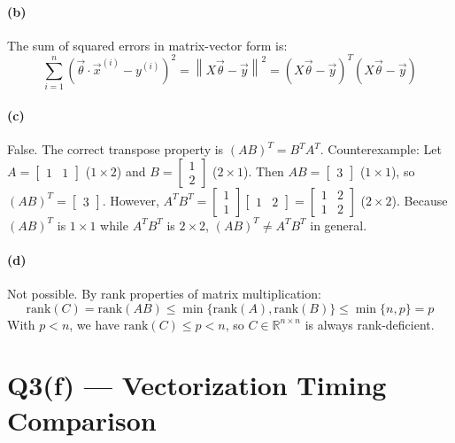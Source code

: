 \documentclass[11pt]{article}
\newcommand{\R}{\mathbb{R}}
\begin{document}
\paragraph{(b)} The sum of squared errors in matrix-vector form is:
\[ \sum_{i=1}^n\left(\vec{\theta}\cdot\vec{x}^{(i)}-y^{(i)}\right)^2 = \left\|X\vec{\theta}-\vec{y}\right\|^2 = \left(X\vec{\theta}-\vec{y}\right)^T\left(X\vec{\theta}-\vec{y}\right) \]

\paragraph{(c)} False. The correct transpose property is $(AB)^T=B^TA^T$.
Counterexample: Let $A=\begin{bmatrix}1&1\end{bmatrix}$ ($1\times2$) and $B=\begin{bmatrix}1\\2\end{bmatrix}$ ($2\times1$).
Then $AB=\begin{bmatrix}3\end{bmatrix}$ ($1\times1$), so $(AB)^T=\begin{bmatrix}3\end{bmatrix}$.
However, $A^TB^T = \begin{bmatrix}1\\1\end{bmatrix}\begin{bmatrix}1&2\end{bmatrix} = \begin{bmatrix}1&2\\1&2\end{bmatrix}$ ($2\times2$).
Because $(AB)^T$ is $1\times1$ while $A^TB^T$ is $2\times2$, $(AB)^T \neq A^TB^T$ in general.

\paragraph{(d)} Not possible. By rank properties of matrix multiplication:
\[ \mathrm{rank}(C)=\mathrm{rank}(AB)\le\min\{\mathrm{rank}(A),\mathrm{rank}(B)\}\le\min\{n,p\}=p \]
With $p < n$, we have $\mathrm{rank}(C) \le p < n$, so $C \in \R^{n\times n}$ is always rank-deficient.

\newpage
\section*{Q3(f) --- Vectorization Timing Comparison}
\end{document}
